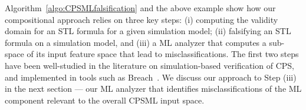 Algorithm~\ref{algo:CPSMLfalsification} and the above example 
show how our compositional approach relies on three key
steps:
(i) computing the validity domain for an STL formula for
a given simulation model;
(ii) falsifying an STL formula on a simulation model,
and 
(iii) a ML analyzer that computes a sub-space of its input
feature space that lead to misclassifications.
The first two steps have been well-studied in the literature
on simulation-based verification of CPS, and implemented in
tools such as Breach~\cite{donze2010breach}. 
We discuss our approach to Step (iii) in the next section
--- our ML analyzer
that identifies misclassifications of the ML component
relevant to the overall CPSML input space.






